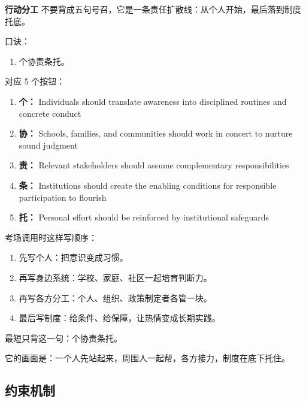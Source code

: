 ﻿\documentclass[lang=cn,11pt]{elegantbook}
\begin{document}
\begin{note}
\textbf{行动分工} 不要背成五句号召，它是一条责任扩散线：从个人开始，最后落到制度托底。

口诀：

\begin{enumerate}
  \item 个协责条托。
\end{enumerate}

对应 5 个按钮：

\begin{enumerate}
  \item \textbf{个：} Individuals should translate awareness into disciplined routines and concrete conduct
  \item \textbf{协：} Schools, families, and communities should work in concert to nurture sound judgment
  \item \textbf{责：} Relevant stakeholders should assume complementary responsibilities
  \item \textbf{条：} Institutions should create the enabling conditions for responsible participation to flourish
  \item \textbf{托：} Personal effort should be reinforced by institutional safeguards
\end{enumerate}

考场调用时这样写顺序：

\begin{enumerate}
  \item 先写个人：把意识变成习惯。
  \item 再写身边系统：学校、家庭、社区一起培育判断力。
  \item 再写各方分工：个人、组织、政策制定者各管一块。
  \item 最后写制度：给条件、给保障，让热情变成长期实践。
\end{enumerate}

最短只背这一句：个协责条托。

它的画面是：一个人先站起来，周围人一起帮，各方接力，制度在底下托住。
\end{note}

\subsection{约束机制}
\end{document}
